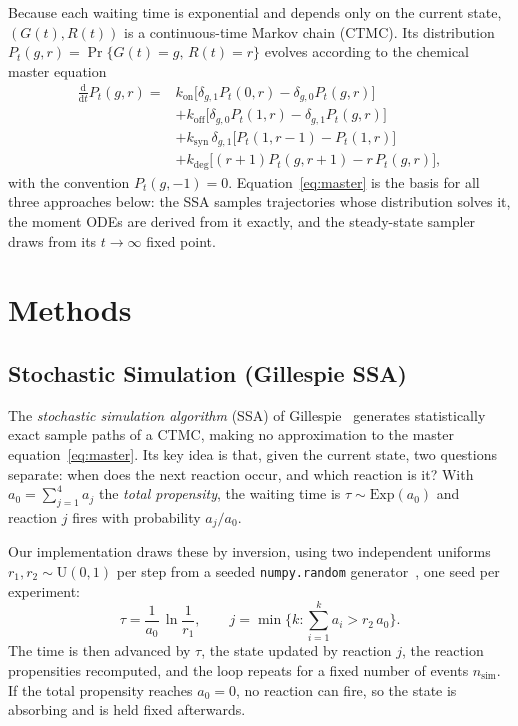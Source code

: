 \documentclass[11pt]{article}
\newcommand{\kon}{k_{\mathrm{on}}}
\newcommand{\koff}{k_{\mathrm{off}}}
\newcommand{\ksyn}{k_{\mathrm{syn}}}
\newcommand{\kdeg}{k_{\mathrm{deg}}}
\begin{document}
Because each waiting time is exponential and depends only on the current state,
$(G(t),R(t))$ is a continuous-time Markov chain (CTMC). Its
distribution $P_t(g,r)=\Pr\{G(t)=g,\,R(t)=r\}$ evolves according to the chemical
master equation~\cite{vankampen}
\begin{equation}
\label{eq:master}
\begin{aligned}
  \frac{\mathrm{d}}{\mathrm{d}t} P_t(g,r)
  ={}& \kon\big[\delta_{g,1}P_t(0,r) - \delta_{g,0}P_t(g,r)\big] \\
   &+ \koff\big[\delta_{g,0}P_t(1,r) - \delta_{g,1}P_t(g,r)\big] \\
   &+ \ksyn\,\delta_{g,1}\big[P_t(1,r-1) - P_t(1,r)\big] \\
   &+ \kdeg\big[(r+1)P_t(g,r+1) - r\,P_t(g,r)\big],
\end{aligned}
\end{equation}
with the convention $P_t(g,-1)=0$.
Equation~\eqref{eq:master} is the basis for all three approaches below: the SSA samples trajectories whose distribution solves it, the moment ODEs are derived from it exactly,
and the steady-state sampler draws from its $t\to\infty$ fixed point.

\section{Methods}
\label{sec:methods}

\subsection{Stochastic Simulation (Gillespie SSA)}
\label{sec:ssa}

The \emph{stochastic simulation algorithm} (SSA) of
Gillespie~\cite{gillespie1976,gillespie1977,gillespie2007} generates statistically
exact sample paths of a CTMC, making no approximation to the master
equation~\eqref{eq:master}. Its key idea is that, given the current state, two
questions separate: when does the next reaction occur, and which reaction is it?
With $a_0=\sum_{j=1}^{4} a_j$ the \emph{total propensity}, the waiting time is
$\tau\sim\mathrm{Exp}(a_0)$ and reaction $j$ fires with probability $a_j/a_0$.

Our implementation draws these by inversion, using two independent uniforms
$r_1,r_2\sim\mathrm{U}(0,1)$ per step from a seeded \texttt{numpy.random} generator~\cite{harris2020},
one seed per experiment:
\begin{equation}
  \tau = \frac{1}{a_0}\,\ln\!\frac{1}{r_1},
  \qquad
  j = \min\Big\{ k : \textstyle\sum_{i=1}^{k} a_i > r_2\,a_0 \Big\}.
\end{equation}
The time is then advanced by $\tau$, the state updated by reaction $j$, the reaction
propensities recomputed, and the loop repeats for a fixed number of events
$n_{\mathrm{sim}}$. If the total propensity reaches $a_0=0$, no reaction can
fire, so the state is absorbing and is held fixed afterwards.
\end{document}
